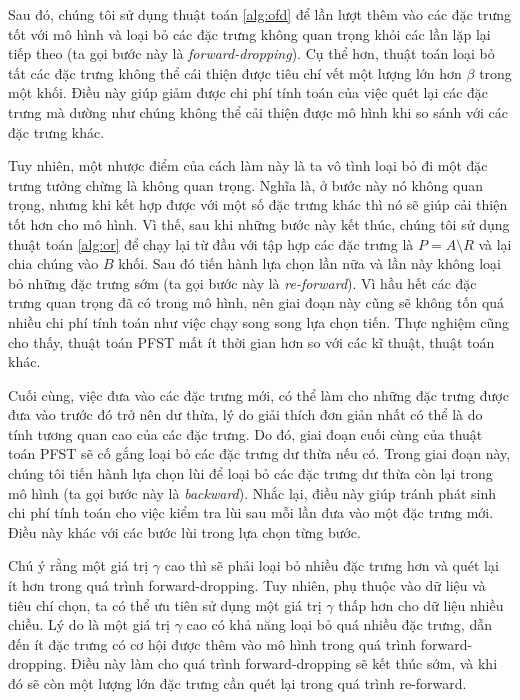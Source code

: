Sau đó, chúng tôi sử dụng thuật toán \ref{alg:ofd} để lần lượt thêm vào các đặc trưng tốt với mô hình và loại bỏ các đặc trưng không quan trọng khỏi các lần lặp lại tiếp theo (ta gọi bước này là \textit{forward-dropping}). Cụ thể hơn, thuật toán loại bỏ tất các đặc trưng không thể cái thiện được tiêu chí vết một lượng lớn hơn $\beta$ trong một khối. Điều này giúp giảm được chi phí tính toán của việc quét lại các đặc trưng mà dường như chúng không thể cải thiện được mô hình khi so sánh với các đặc trưng khác.

Tuy nhiên, một nhược điểm của cách làm này là ta vô tình loại bỏ đi một đặc trưng tưởng chừng là không quan trọng. Nghĩa là, ở bước này nó không quan trọng, nhưng khi kết hợp được với một số đặc trưng khác thì nó sẽ giúp cải thiện tốt hơn cho mô hình. Vì thế, sau khi những bước này kết thúc, chúng tôi sử dụng thuật toán \ref{alg:or} để chạy lại từ đầu với tập hợp các đặc trưng là $P = A\setminus R$ và lại chia chúng vào $B$ khối. Sau đó tiến hành lựa chọn lần nữa và lần này không loại bỏ những đặc trưng sớm (ta gọi bước này là \textit{re-forward}). Vì hầu hết các đặc trưng quan trọng đã có trong mô hình, nên giai đoạn này cũng sẽ không tốn quá nhiều chi phí tính toán như việc chạy song song lựa chọn tiến. Thực nghiệm cũng cho thấy, thuật toán PFST mất ít thời gian hơn so với các kĩ thuật, thuật toán khác.

Cuối cùng, việc đưa vào các đặc trưng mới, có thể làm cho những đặc trưng được đưa vào trước đó trở nên dư thừa, lý do giải thích đơn giản nhất có thể là do tính tương quan cao của các đặc trưng. Do đó, giai đoạn cuối cùng của thuật toán PFST sẽ cố gắng loại bỏ các đặc trưng dư thừa nếu có. Trong giai đoạn này, chúng tôi tiến hành lựa chọn lùi để loại bỏ các đặc trưng dư thừa còn lại trong mô hình (ta gọi bước này là \textit{backward}). Nhắc lại, điều này giúp tránh phát sinh chi phí tính toán cho việc kiểm tra lùi sau mỗi lần đưa vào một đặc trưng mới. Điều này khác với các bước lùi trong lựa chọn từng bước.

Chú ý rằng một giá trị $\gamma$ cao thì sẽ phải loại bỏ nhiều đặc trưng hơn và quét lại ít hơn trong quá trình forward-dropping. Tuy nhiên, phụ thuộc vào dữ liệu và tiêu chí chọn, ta có thể ưu tiên sử dụng một giá trị $\gamma$ thấp hơn cho dữ liệu nhiều chiều. Lý do là một giá trị $\gamma$ cao có khả năng loại bỏ quá nhiều đặc trưng, dẫn đến ít đặc trưng có cơ hội được thêm vào mô hình trong quá trình forward-dropping. Điều này làm cho quá trình forward-dropping sẽ kết thúc sớm, và khi đó sẽ còn một lượng lớn đặc trưng cần quét lại trong quá trình re-forward.

